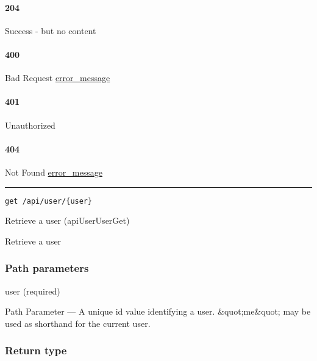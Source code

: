 \hypertarget{section-577}{%
\paragraph{204}\label{section-577}}

Success - but no content \protect\hyperlink{}{}

\hypertarget{section-578}{%
\paragraph{400}\label{section-578}}

Bad Request \protect\hyperlink{error_message}{error\_message}

\hypertarget{section-579}{%
\paragraph{401}\label{section-579}}

Unauthorized \protect\hyperlink{}{}

\hypertarget{section-580}{%
\paragraph{404}\label{section-580}}

Not Found \protect\hyperlink{error_message}{error\_message}

\begin{center}\rule{0.5\linewidth}{\linethickness}\end{center}

\protect\hypertarget{apiUserUserGet}{}{}

\begin{verbatim}
get /api/user/{user}
\end{verbatim}

Retrieve a user ({apiUserUserGet})

Retrieve a user

\hypertarget{path-parameters-98}{%
\subsubsection{Path parameters}\label{path-parameters-98}}

user (required)

{Path Parameter} --- A unique id value identifying a user.
\&quot;me\&quot; may be used as shorthand for the current user.

\hypertarget{return-type-137}{%
\subsubsection{Return type}\label{return-type-137}}

